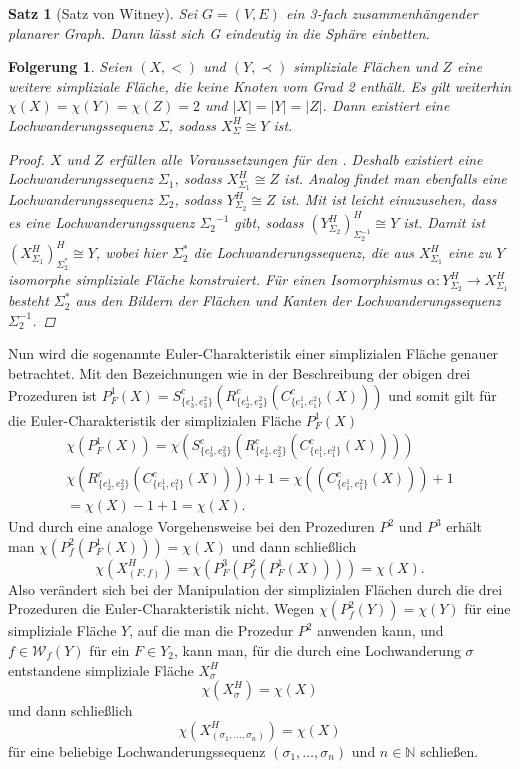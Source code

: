 \documentclass[12pt,titlepage,twoside,cleardoublepage]{article}
\theoremstyle{nummermitklammern}
\newtheorem{folgerung}[temp]{Folgerung}
\newtheorem{satz}[temp]{Satz}
\newtheorem{folgerung}[zahl]{Folgerung}
\newtheorem{satz}[zahl]{Satz}
\numberwithin{equation}{section}
\begin{document}
\begin{satz}[Satz von Witney]
Sei $G=(V,E)$ ein 3-fach zusammenhängender planarer Graph. Dann lässt sich G eindeutig in die Sphäre einbetten. \cite{withney}
\end{satz}%
\begin{folgerung}
Seien $(X,<)$ und $(Y,\prec)$ simpliziale Flächen und $Z$ eine weitere simpliziale Fläche, die keine Knoten vom Grad 2 enthält. Es gilt weiterhin $\chi(X)=\chi(Y)=\chi(Z)=2$ und $\vert X\vert=\vert Y\vert=\vert Z\vert$. Dann existiert eine Lochwanderungssequenz $\Sigma$, sodass $X^H_{\Sigma} \cong Y$ ist.
\begin{proof}
$X$ und $Z$ erfüllen alle Voraussetzungen für den . 
Deshalb existiert eine Lochwanderungssequenz $\Sigma_1$, sodass $X_{\Sigma_1}^H \cong Z$ ist.
 Analog findet man ebenfalls eine Lochwanderungssequenz $\Sigma_2$, sodass $Y_{\Sigma_2}^H \cong Z$ ist. 
Mit  ist leicht einuzusehen, dass es eine Lochwanderungssquenz ${\Sigma_2}^{-1}$ gibt, sodass ${(Y_{\Sigma_2}^H)}^H_{\Sigma_2^{-1}} \cong Y$ ist.
 Damit ist ${(X^H_{\Sigma_1})}_{\Sigma_2^{*}}^H\cong Y$, wobei hier $\Sigma_2^{*}$ die Lochwanderungssequenz, die aus  $X^H_{\Sigma_1}$ eine zu $Y$ isomorphe simpliziale Fläche konstruiert. Für einen Isomorphismus $\alpha:Y^H_{\Sigma_2} \to X^H_{\Sigma_1}$ besteht $\Sigma^*_2$ aus den Bildern der Flächen und Kanten der Lochwanderungssequenz $\Sigma_2^{-1}$. 
 \end{proof}
\end{folgerung}
Nun wird die sogenannte Euler-Charakteristik einer simplizialen Fläche genauer betrachtet.
Mit den Bezeichnungen wie in der Beschreibung der obigen drei Prozeduren ist $P_F^1(X)=S^c_{\{e_3^1,e_3^2\}}(R^c_{\{e_2^1,e_2^2\}}(C^c_{\{ e_1^1,e_1^2\} }(X)))$ und somit gilt für die Euler-Charakteristik der simplizialen Fläche $P^1_F(X)$ 
\begin{gather*}
\chi (P^1_F(X))=\chi(S^c_{\{e_3^1,e_3^2\}}(R^c_{\{e_2^1,e_2^2\}}(C^c_{\{ e_1^1,e_1^2\} }(X))))\\
\chi(R^c_{\{e_2^1,e_2^2\}}(C^c_{\{ e_1^1,e_1^2\} }(X))))+1=\chi((C^c_{\{ e_1^1,e_1^2\} }(X)))+1\\
=\chi(X)-1+1=\chi(X).
\end{gather*}
Und durch eine analoge Vorgehensweise bei den Prozeduren $P^2$ und $P^3$ erhält man $\chi(P_f^2(P_F^1(X)))=\chi(X)$ und dann schließlich 
\[
\chi(X^H_{(F,f)})=\chi(P^3_F(P_f^2(P_F^1(X))))=\chi(X).
\]
Also verändert sich bei der Manipulation der simplizialen Flächen durch die drei Prozeduren die Euler-Charakteristik nicht. Wegen $\chi(P^2_f(Y))=\chi(Y)$ für  eine simpliziale Fläche $Y$, auf die man die Prozedur $P^2$ anwenden kann, und $f \in \mathcal{W}_f(Y)$ für ein $F\in Y_2$, kann man, für die durch eine Lochwanderung $\sigma$ entstandene simpliziale Fläche $X^H_{\sigma}$
\[
\chi(X^H_{\sigma})=\chi(X)
\]
und dann schließlich
\[
\chi (X_{(\sigma_1,\ldots, \sigma_n)}^H)=\chi(X)
\]
für eine beliebige Lochwanderungssequenz $(\sigma_1,\ldots, \sigma_n)$ und $n\in \mathbb{N}$ schließen.
\end{document}
